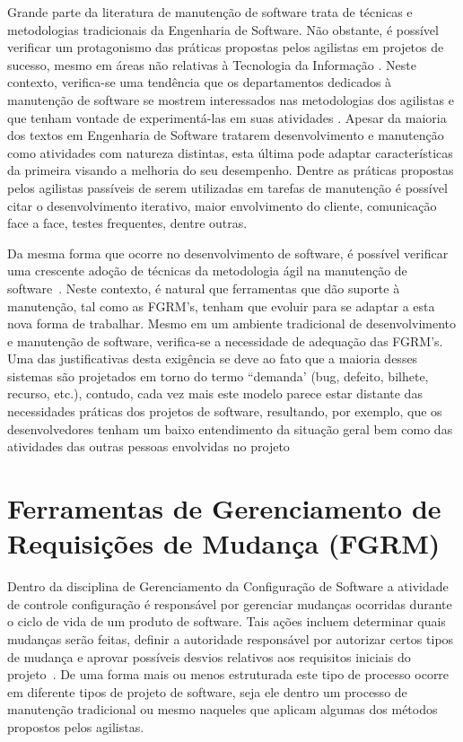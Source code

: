 Grande parte da literatura de manutenção de software trata de técnicas e metodologias tradicionais
da Engenharia de Software. Não obstante, é possível verificar um protagonismo das práticas propostas
pelos agilistas em projetos de sucesso, mesmo em áreas não relativas à Tecnologia da Informação
\cite{Serrador2015}. Neste contexto, verifica-se uma tendência que os departamentos dedicados à
manutenção de software se mostrem interessados nas metodologias dos agilistas e que tenham vontade
de experimentá-las em suas atividades \cite{Heeager2015}. Apesar da maioria dos textos em Engenharia
de Software tratarem desenvolvimento e manutenção como atividades com natureza distintas, esta
última pode adaptar características da primeira visando a melhoria do seu desempenho. Dentre as
práticas propostas pelos agilistas passíveis de serem utilizadas em tarefas de manutenção é possível
citar o desenvolvimento iterativo, maior envolvimento do cliente, comunicação face a face, testes
frequentes, dentre outras.

Da mesma forma que ocorre no desenvolvimento de software, é possível verificar uma crescente adoção
de técnicas da metodologia ágil na manutenção de software~\cite{Soltan2016,Devulapally2015,
	Heeager2015}. Neste contexto, é natural que ferramentas que dão suporte à manutenção, tal como
as FGRM's, tenham que evoluir para se adaptar a esta nova forma de trabalhar. Mesmo em um ambiente
tradicional de  desenvolvimento e manutenção de software, verifica-se a necessidade de adequação das
FGRM's. Uma das justificativas desta exigência se deve ao fato que a maioria desses sistemas são
projetados em torno do termo ``demanda' (bug, defeito, bilhete, recurso, etc.), contudo, cada vez
mais este modelo parece estar distante das necessidades práticas dos projetos de software,
resultando, por exemplo, que os desenvolvedores tenham um
baixo entendimento da situação geral bem como das atividades das outras pessoas
envolvidas no projeto~\cite{Baysal:2013:SAP:2486788.2486957}

\section{Ferramentas de Gerenciamento de Requisições de Mudança (FGRM)}
\label{sec:ferramentas_de_gerenciameto_de_requisições_de_mudança}

Dentro da disciplina de Gerenciamento da Configuração de Software a atividade
de controle configuração é responsável por gerenciar mudanças ocorridas durante
o ciclo de vida de um produto de software. Tais ações incluem determinar
quais mudanças serão feitas, definir a autoridade responsável por autorizar certos
tipos de mudança e aprovar possíveis desvios relativos aos requisitos iniciais
do projeto~\cite{4425813}. De uma forma mais ou menos estruturada este tipo de
processo ocorre em diferente tipos de projeto de software, seja ele dentro um
processo de manutenção tradicional ou mesmo naqueles que aplicam algumas dos
métodos propostos pelos agilistas. 

